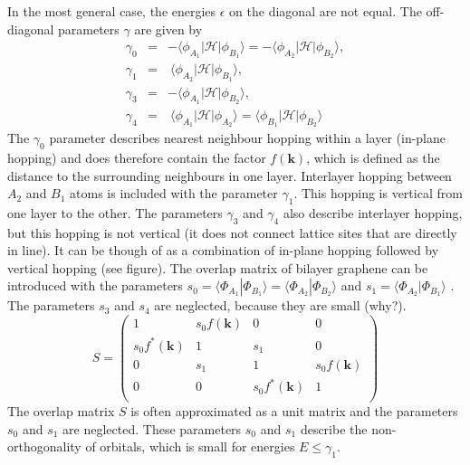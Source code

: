 In the most general case, the energies $\epsilon$ on the diagonal are not equal. The off-diagonal parameters $\gamma$ are given by
\begin{eqnarray}
\gamma_0 &=& - \langle \phi_{A_1} | \mathcal{H} | \phi_{B_1} \rangle = - \langle \phi_{A_2} | \mathcal{H} | \phi_{B_2} \rangle, \\
\gamma_1 &=& ~\langle \phi_{A_2} | \mathcal{H} | \phi_{B_1} \rangle, \\
\gamma_3 &=& - \langle \phi_{A_1} | \mathcal{H} | \phi_{B_2} \rangle, \\
\gamma_4 &=& ~\langle \phi_{A_1} | \mathcal{H} | \phi_{A_2} \rangle = \langle \phi_{B_1} | \mathcal{H} | \phi_{B_2} \rangle
\end{eqnarray}
The $\gamma_0$ parameter describes nearest neighbour hopping within a layer (in-plane hopping) and does therefore contain the factor $f\left( \mathbf{k} \right)$, which is defined as the distance to the surrounding neighbours in one layer. %
Interlayer hopping between $A_2$ and $B_1$ atoms is included with the parameter $\gamma_1$. This hopping is vertical from one layer to the other. The parameters $\gamma_3$ and $\gamma_4$ also describe interlayer hopping, but this hopping is not vertical (it does not connect lattice sites that are directly in line). It can be though of as a combination of in-plane hopping followed by vertical hopping (see figure).
The overlap matrix of bilayer graphene can be introduced with the parameters $s_0 = \langle \Phi_{A_1} | \Phi_{B_1} \rangle = \langle \Phi_{A_2} | \Phi_{B_2} \rangle $ and $s_1 = \langle \Phi_{A_2}  | \Phi_{B_1} \rangle $ \cite{Mucha-Kruczynski2010}. The parameters $s_3$ and $s_4$ are neglected, because they are small (why?).
\begin{equation}
S = \begin{pmatrix}
1 & s_0 f\left( \mathbf{k} \right)& 0 & 0 \\
s_0 f^*\left( \mathbf{k} \right) & 1 & s_1 & 0 \\
0 & s_1 & 1 & s_0 f\left( \mathbf{k} \right) \\
0 & 0 & s_0 f^* \left( \mathbf{k} \right) & 1\\
\end{pmatrix}
\end{equation}
The overlap matrix $S$ is often approximated as a unit matrix and the parameters $s_0$ and $s_1$ are neglected. These parameters $s_0$ and $s_1$ describe the non-orthogonality of orbitals, which is small for energies $E \leq \gamma_1$.

